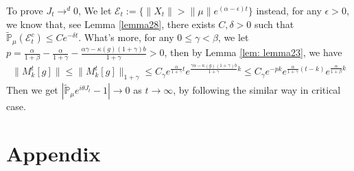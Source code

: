 \documentclass[12pt, a4paper]{amsart}
\theoremstyle{definition}
\numberwithin{equation}{section}
\begin{document}
To prove $J_t\rightarrow^d 0$, We let $\mathcal{E}_t:=\{\|X_t\|>\|\mu\|e^{(\alpha-\epsilon )t}\}$ instead, for any $\epsilon>0$, we know that, see Lemma \ref{lemma28}, there exists
$C,\delta >0$ such that  $\mathbb{\tilde{P}}_{\mu}(\mathcal{E}_t^c)\leq C e^{-\delta t}$. What's more, for any $0\leq \gamma <\beta$, we let $p=\frac{\alpha}{1+\beta}-\frac{\alpha}{1+\gamma} - \frac{\alpha\gamma-\kappa(g)(1+\gamma)b}{1+\gamma}>0$, then by Lemma \ref{lem: lemma23}, we have
\begin{align*}
    \|M_k^t[g]\|\leq \|M_k^t[g]\|_{1+\gamma}\leq C_{\gamma} e^{\frac{\alpha}{1+\gamma}t}e^{\frac{\gamma \alpha-\kappa(g)(1+\gamma)b}{1+\gamma}k}\leq C_{\gamma} e^{-pk}e^{\frac{\alpha}{1+\gamma}(t-k)}e^{\frac{\alpha}{1+\beta}k}
\end{align*}
Then we get $  \left|\mathbb{\tilde{P}}_{\mu}e^{i\theta J_t}-1\right|\rightarrow 0$ as $ t\rightarrow \infty$, by following the similar way in critical case.

\section{Appendix}
\end{document}
